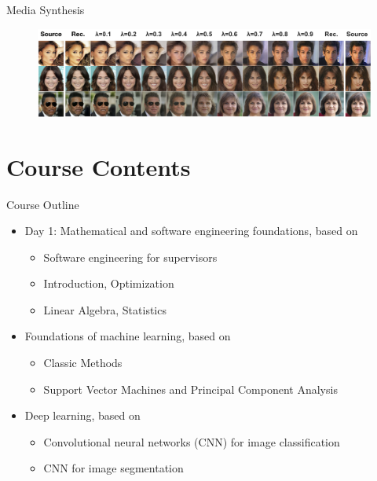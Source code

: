 \documentclass{beamer}
\begin{document}
    \begin{frame}{Media Synthesis \cite{ho2020denoising}}
      \begin{figure}
        \includegraphics[width=\linewidth]{./figures/interp.jpg}
      \end{figure}
    \end{frame}


    \section{Course Contents}



    \begin{frame}{Course Outline}
      \begin{itemize}
        \item Day 1: Mathematical and software engineering foundations, based on \cite{deisenroth_faisal_ong_2020}
         \begin{itemize}
            \item  Software engineering for supervisors
            \item  Introduction, Optimization
            \item  Linear Algebra, Statistics
         \end{itemize}
        \item Foundations of machine learning, based on \cite{deisenroth_faisal_ong_2020}
        \begin{itemize}
          \item Classic Methods
          \item Support Vector Machines and Principal Component Analysis
        \end{itemize}
        \item Deep learning, based on \cite{Goodfellow_et_al_2016}
        \begin{itemize}
          \item Convolutional neural networks (CNN) for image classification
          \item CNN for image segmentation
        \end{itemize}
      \end{itemize}
    \end{frame}
\end{document}

